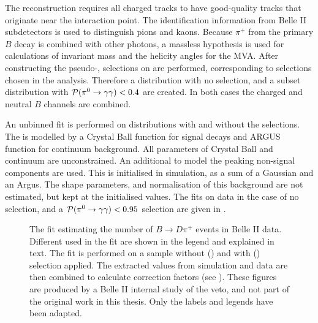 The reconstruction requires all charged tracks to have good-quality tracks that originate near the interaction point.
The identification information from Belle II subdetectors is used to distinguish pions and kaons.
Because $\pi^+$ from the primary $B$ decay is combined with other photons, a massless hypothesis is used for calculations of invariant mass and the helicity angles for the MVA.
After constructing the pseudo-\piz, selections on \piVeto are performed, corresponding to selections chosen in the analysis.
Therefore a distribution with no \piVeto selection, and a subset distribution with ${\mathcal{P}(\pi^0\rightarrow\gamma\gamma)}<0.4$ are created.
In both cases the charged and neutral $B$ channels are combined.

An unbinned \Mbc fit is performed on distributions with and without the \piVeto selections.
The \Mbc is modelled by a Crystal Ball function for signal decays and ARGUS function for continuum background.
All parameters of Crystal Ball and continuum are unconstrained.
An additional \PDF to model the peaking non-signal \BB components are used.
This \PDF is initialised in simulation, as a sum of a Gaussian and an Argus.
The shape parameters, and normalisation of this \BB background \PDF are not estimated, but kept at the initialised values.
The fits on data in the case of no \piVeto selection, and a ${\mathcal{P}(\pi^0\rightarrow\gamma\gamma)}<0.95$ selection are given in .
\begin{figure}[htbp!]
    \centering
    \caption{\label{fig:pivetofit} The fit estimating the number of $B\to D \pi^+$ events in Belle II data.
    Different  used in the fit are shown in the legend and explained in text.
    The fit is performed on a sample without () and with () \piVeto selection applied.
    The extracted values from simulation and data are then combined to calculate \piVeto correction factors (see ).
    These figures are produced by a Belle II internal study of the \piz veto, and not part of the original work in this thesis.
    Only the labels and legends have been adapted.    
    }
\end{figure}

